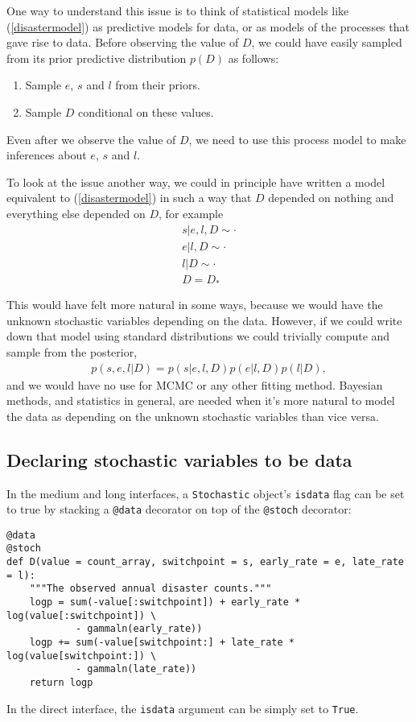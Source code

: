One way to understand this issue is to think of statistical models like (\ref{disastermodel}) as predictive models for data, or as models of the processes that gave rise to data. Before observing the value of $D$, we could have easily sampled from its prior predictive distribution $p(D)$ as follows:
\begin{enumerate}
    \item Sample $e$, $s$ and $l$ from their priors.
    \item Sample $D$ conditional on these values.
\end{enumerate}
Even after we observe the value of $D$, we need to use this process model to make inferences about $e$, $s$ and $l$.

\medskip
To look at the issue another way, we could in principle have written a model equivalent to (\ref{disastermodel}) in such a way that $D$ depended on nothing and everything else depended on $D$, for example
\begin{eqnarray*}
    s|e,l,D\sim\cdot\\
    e|l,D\sim\cdot\\
    l|D\sim\cdot\\
    D=D_*
\end{eqnarray*}

This would have felt more natural in some ways, because we would have the unknown stochastic variables depending on the data. However, if we could write down that model using standard distributions we could trivially compute and sample from the posterior,
\begin{eqnarray*}
    p(s,e,l|D) = p(s|e, l, D) p(e|l, D) p(l|D),
\end{eqnarray*}
and we would have no use for MCMC or any other fitting method. Bayesian methods, and statistics in general, are needed when it's more natural to model the data as depending on the unknown stochastic variables than vice versa.

\subsection{Declaring stochastic variables to be data}

In the medium and long interfaces, a \texttt{Stochastic} object's \texttt{isdata} flag can be set to true by stacking a \texttt{@data} decorator on top of the \texttt{@stoch} decorator:
\begin{verbatim}
@data
@stoch
def D(value = count_array, switchpoint = s, early_rate = e, late_rate = l):
    """The observed annual disaster counts."""
    logp = sum(-value[:switchpoint]) + early_rate * log(value[:switchpoint]) \
            - gammaln(early_rate))
    logp += sum(-value[switchpoint:] + late_rate * log(value[switchpoint:]) \
            - gammaln(late_rate))
    return logp
\end{verbatim}
In the direct interface, the \texttt{isdata} argument can be simply set to \texttt{True}.


